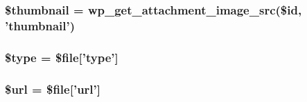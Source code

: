 \hypertarget{settings__ajax_8php_a7f835c9ddb57cb4a7f20c89382f45dab}{
\subsubsection[{\$thumbnail}]{\setlength{\rightskip}{0pt plus 5cm}\$thumbnail = wp\_\-get\_\-attachment\_\-image\_\-src(\$id, 'thumbnail')}}
\label{d5/d83/settings__ajax_8php_a7f835c9ddb57cb4a7f20c89382f45dab}
\hypertarget{settings__ajax_8php_a9a4a6fba2208984cabb3afacadf33919}{
\subsubsection[{\$type}]{\setlength{\rightskip}{0pt plus 5cm}\$type = \$file\mbox{[}'type'\mbox{]}}}
\label{d5/d83/settings__ajax_8php_a9a4a6fba2208984cabb3afacadf33919}
\hypertarget{settings__ajax_8php_acf215f34a917d014776ce684a9ee8909}{
\subsubsection[{\$url}]{\setlength{\rightskip}{0pt plus 5cm}\$url = \$file\mbox{[}'url'\mbox{]}}}
\label{d5/d83/settings__ajax_8php_acf215f34a917d014776ce684a9ee8909}
